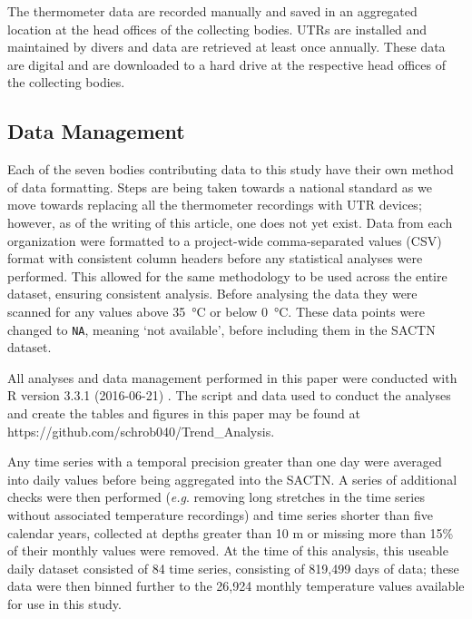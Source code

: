 \documentclass[]{ametsoc}
\begin{document}
The thermometer data are recorded manually and saved in an aggregated location at the head offices of the collecting bodies. UTRs are installed and maintained by divers and data are retrieved at least once annually. These data are digital and are downloaded to a hard drive at the respective head offices of the collecting bodies.

\subsection{Data Management}
Each of the seven bodies contributing data to this study have their own method of data formatting. Steps are being taken towards a national standard as we move towards replacing all the thermometer recordings with UTR devices; however, as of the writing of this article, one does not yet exist. Data from each organization were formatted to a project-wide comma-separated values (CSV) format with consistent column headers before any statistical analyses were performed. This allowed for the same methodology to be used across the entire dataset, ensuring consistent analysis. Before analysing the data they were scanned for any values above \SI{35}{\degreeCelsius} or below \SI{0}{\degreeCelsius}. These data points were changed to \texttt{NA}, meaning `not available', before including them in the SACTN dataset.

All analyses and data management performed in this paper were conducted with R version 3.3.1 (2016-06-21) \citep{R}. The script and data used to conduct the analyses and create the tables and figures in this paper may be found at https://github.com/schrob040/Trend\_Analysis.

Any time series with a temporal precision greater than one day were averaged into daily values before being aggregated into the SACTN. A series of additional checks were then performed (\emph{e.g}. removing long stretches in the time series without associated temperature recordings) and time series shorter than five calendar years, collected at depths greater than 10 m or missing more than 15\% of their monthly values were removed. At the time of this analysis, this useable daily dataset consisted of 84 time series, consisting of 819,499 days of data; these data were then binned further to the 26,924 monthly temperature values available for use in this study.
\end{document}
